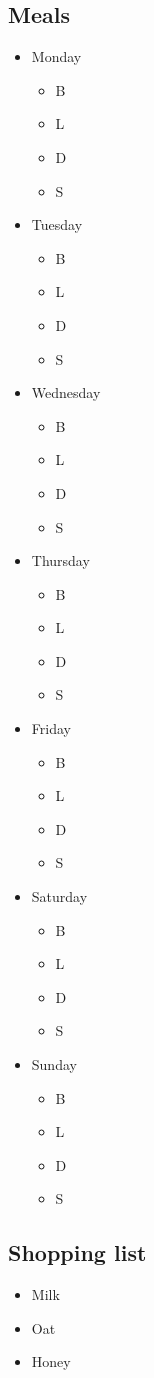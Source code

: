 \documentclass[a4paper]{article}
\begin{document}
\subsection{Meals}
\begin{itemize}
  \item Monday
		\begin{itemize}
     \item B
     \item L
     \item D
     \item S
     \end{itemize}
  \item Tuesday
		\begin{itemize}
     \item B
     \item L
     \item D
     \item S
     \end{itemize}
  \item Wednesday
		\begin{itemize}
     \item B
     \item L
     \item D
     \item S
     \end{itemize}
	\item Thursday
		\begin{itemize}
     \item B
     \item L
     \item D
     \item S
     \end{itemize}
	\item Friday
		\begin{itemize}
     \item B
     \item L
     \item D
     \item S
     \end{itemize}
	\item Saturday
		\begin{itemize}
     \item B
     \item L
     \item D
     \item S
     \end{itemize}
	\item	Sunday
		\begin{itemize}
     \item B
     \item L
     \item D
     \item S
     \end{itemize}
\end{itemize}
\subsection{Shopping list}
		\begin{itemize}
     \item Milk
     \item Oat
     \item Honey
     \end{itemize}
\end{document}
